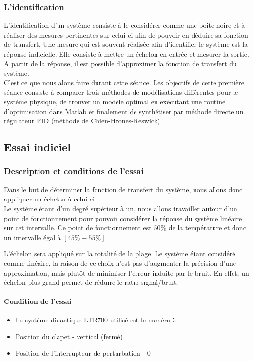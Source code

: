 \subsubsection{L'identification}
L'identification d'un système consiste à le considérer comme une boite noire et à réaliser
des mesures pertinentes sur celui-ci afin de pouvoir en déduire sa fonction de transfert.
Une mesure qui est souvent réalisée afin d'identifier le système est la réponse indicielle.
Elle consiste à mettre un échelon en entrée et mesurer la sortie. A partir de la réponse,
il est possible d'approximer la fonction de transfert du système.\\

C'est ce que nous alons faire durant cette séance. Les objectifs de cette 
première séance consiste à comparer trois méthodes de modélisations 
différentes pour le système physique, de trouver un modèle optimal en exécutant une routine
d'optimisation dans Matlab et finalement de synthétiser par méthode directe un 
régulateur PID (méthode de Chien-Hrones-Reswick).


\subsection{Essai indiciel}
\subsubsection{Description et conditions de l'essai}
Dans le but de déterminer la fonction de transfert du système, nous allons donc appliquer un échelon à celui-ci.\\

Le système étant d'un degré supérieur à un, nous allons travailler autour d'un point de fonctionnement pour pouvoir considérer la réponse du système linéaire sur cet intervalle. Ce point de fonctionnement est 50\% de la température et donc un intervalle égal à $[45\% - 55\%]$

L'échelon sera appliqué sur la totalité de la plage. Le système étant considéré comme linéaire, la raison de ce choix n'est pas d'augmenter la précision d'une approximation, mais plutôt de minimiser l'erreur induite par le bruit. En effet, un échelon plus grand permet de réduire le ratio signal/bruit.\\

\paragraph{Condition de l'essai}
\begin{itemize}
\item Le système didactique LTR700 utilisé est le numéro 3
\item Position du clapet - vertical (fermé)
\item Position de l'interrupteur de perturbation - 0
\end{itemize}

